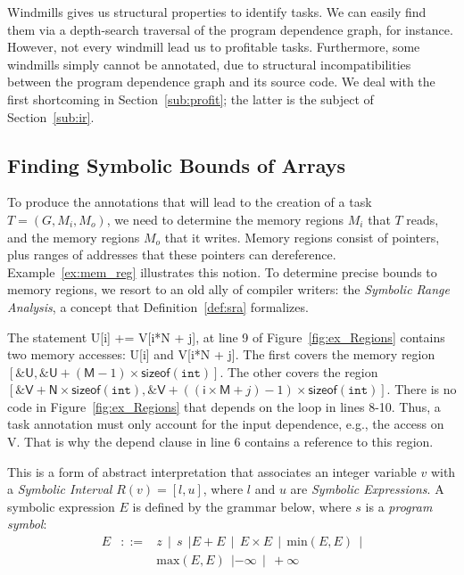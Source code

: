 \documentclass[sigplan,10pt,review,anonymous]{acmart}
\begin{document}
Windmills gives us structural properties to identify tasks.
We can easily find them via a depth-search traversal of the program dependence
graph, for instance.
However, not every windmill lead us to profitable tasks.
Furthermore, some windmills simply cannot be annotated, due to structural 
incompatibilities between the program dependence graph and its source code.
We deal with the first shortcoming in Section~\ref{sub:profit}; the latter is
the subject of Section~\ref{sub:ir}.

\subsection{Finding Symbolic Bounds of Arrays}
\label{sub:symb}

To produce the annotations that will lead to the creation of a task $T = (G, M_i,
M_o)$, we need to determine the memory regions $M_i$ that $T$ reads, and the
memory regions $M_o$ that it writes.
Memory regions consist of pointers, plus ranges of addresses that these pointers
can dereference.
Example~\ref{ex:mem_reg} illustrates this notion.
To determine precise bounds to memory regions, we resort to an old ally of
compiler writers: the {\em Symbolic Range Analysis}, a concept that
Definition~\ref{def:sra} formalizes.

\begin{example}
\label{ex:mem_reg}
The statement \textsf{U[i] += V[i*N + j]}, at line 9 of
Figure~\ref{fig:ex_Regions} contains two memory accesses: \textsf{U[i]} and
\textsf{V[i*N + j]}.
The first covers the memory region $[\mathtt{\&}\mathsf{U},
\mathtt{\&}\mathsf{U} + (\mathsf{M} - 1) \times \mathsf{sizeof}(\mathtt{int})]$.
The other covers the region
$[\mathtt{\&}\mathsf{V} + \mathsf{N} \times \mathsf{sizeof}(\mathtt{int}), \mathtt{\&}\mathsf{V} + ((\mathsf{i} \times \mathsf{M} + j) - 1) \times \mathsf{sizeof}(\mathtt{int})]$.
There is no code in Figure~\ref{fig:ex_Regions} that depends on the
loop in lines 8-10.
Thus, a task annotation must only account for the input dependence, e.g., the
access on \textsf{V}.
That is why the \textsf{depend} clause in line 6 contains a reference to this
region.
\end{example}

\begin{definition}
\label{def:sra}
This is a form of abstract interpretation that associates
an integer variable $v$ with a {\em Symbolic Interval} $R(v) = [l, u]$, where
$l$ and $u$ are {\em Symbolic Expressions}.
A symbolic expression $E$ is defined by the grammar below, where $s$ is a
{\em program symbol}:
\renewcommand{\arraystretch}{0.9}
\[
\begin{array}{rcl}
E & ::= & z \ \ | \ \ s \ \ | E + E \ \ | \ \ E \times E \ \ | \ \  \mbox{min}(E, E) \ \ | \\
&  & \mbox{max}(E, E) \ \ | -\infty \ \ | \ \ +\infty
\end{array}
\]
\end{definition}
\end{document}
